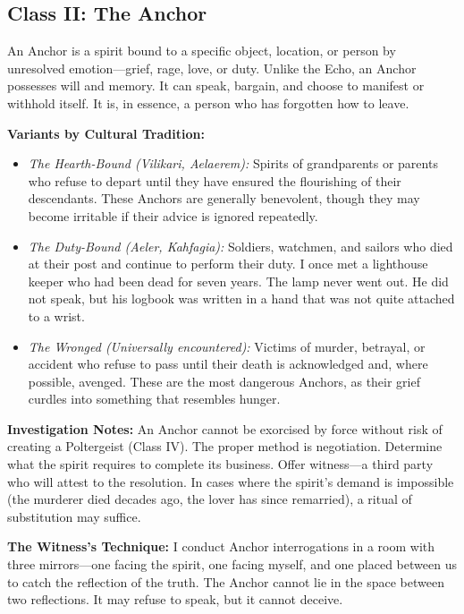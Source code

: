 \subsection{Class II: The Anchor}

An Anchor is a spirit bound to a specific object, location, or person by unresolved emotion---grief, rage, love, or duty. Unlike the Echo, an Anchor possesses will and memory. It can speak, bargain, and choose to manifest or withhold itself. It is, in essence, a person who has forgotten how to leave.

\textbf{Variants by Cultural Tradition:}

\begin{itemize}
  \item \emph{The Hearth-Bound (Vilikari, Aelaerem):} Spirits of grandparents or parents who refuse to depart until they have ensured the flourishing of their descendants. These Anchors are generally benevolent, though they may become irritable if their advice is ignored repeatedly.
  \item \emph{The Duty-Bound (Aeler, Kahfagia):} Soldiers, watchmen, and sailors who died at their post and continue to perform their duty. I once met a lighthouse keeper who had been dead for seven years. The lamp never went out. He did not speak, but his logbook was written in a hand that was not quite attached to a wrist.
  \item \emph{The Wronged (Universally encountered):} Victims of murder, betrayal, or accident who refuse to pass until their death is acknowledged and, where possible, avenged. These are the most dangerous Anchors, as their grief curdles into something that resembles hunger.
\end{itemize}

\textbf{Investigation Notes:} An Anchor cannot be exorcised by force without risk of creating a Poltergeist (Class IV). The proper method is negotiation. Determine what the spirit requires to complete its business. Offer witness---a third party who will attest to the resolution. In cases where the spirit's demand is impossible (the murderer died decades ago, the lover has since remarried), a ritual of substitution may suffice.

\textbf{The Witness's Technique:} I conduct Anchor interrogations in a room with three mirrors---one facing the spirit, one facing myself, and one placed between us to catch the reflection of the truth. The Anchor cannot lie in the space between two reflections. It may refuse to speak, but it cannot deceive.

